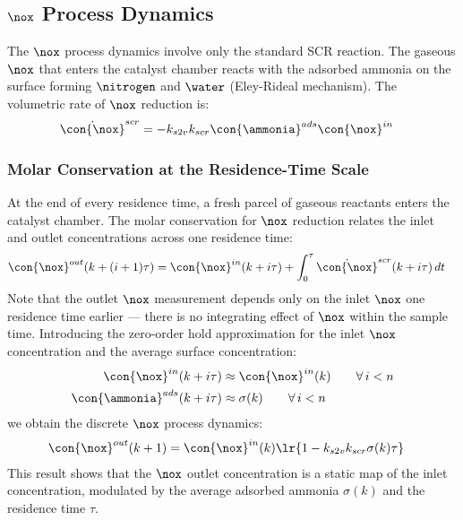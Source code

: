 \subsection{$\nox$ Process Dynamics \label{sec::nox_proc_dyn}}

The $\nox$ process dynamics involve only the standard SCR reaction. The gaseous $\nox$ that enters the catalyst chamber
reacts with the adsorbed ammonia on the surface forming $\nitrogen$ and $\water$ (Eley-Rideal mechanism). The volumetric rate
of $\nox$ reduction is:
\begin{align}
    \dot{\con{\nox}}^{scr} &= -k_{s2v} k_{scr} \con{\ammonia}^{ads} \con{\nox}^{in}
    \label{eqn::nox_rate}
\end{align}

\subsubsection{Molar Conservation at the Residence-Time Scale}
At the end of every residence time, a fresh parcel of gaseous reactants enters the catalyst chamber. The molar
conservation for $\nox$ reduction relates the inlet and outlet concentrations across one residence time:
\begin{align}
    \con{\nox}^{out} (k + (i+1)\tau) &= \con{\nox}^{in} (k + i\tau) + \int_{0}^{\tau}
        \dot{\con{\nox}}^{scr} (k + i\tau) \, dt
    \label{eqn::nox_molar_cons}
\end{align}
Note that the outlet $\nox$ measurement depends only on the inlet $\nox$ one residence time earlier — there is no
integrating effect of $\nox$ within the sample time. Introducing the zero-order hold approximation for the inlet $\nox$
concentration and the average surface concentration:
\begin{align*}
    \con{\nox}^{in} (k + i \tau) &\approx \con{\nox}^{in} (k) \qquad \forall \, i < n \\
    \con{\ammonia}^{ads} (k + i \tau) &\approx \sigma(k) \qquad \forall \, i < n
\end{align*}
we obtain the discrete $\nox$ process dynamics:
\begin{align}
    \con{\nox}^{out} (k + 1) &= \con{\nox}^{in} (k) \lr{1 - k_{s2v} k_{scr} \sigma(k) \tau}
    \label{eqn::NOX_process}
\end{align}
This result shows that the $\nox$ outlet concentration is a static map of the inlet concentration, modulated by the
average adsorbed ammonia $\sigma(k)$ and the residence time $\tau$.
